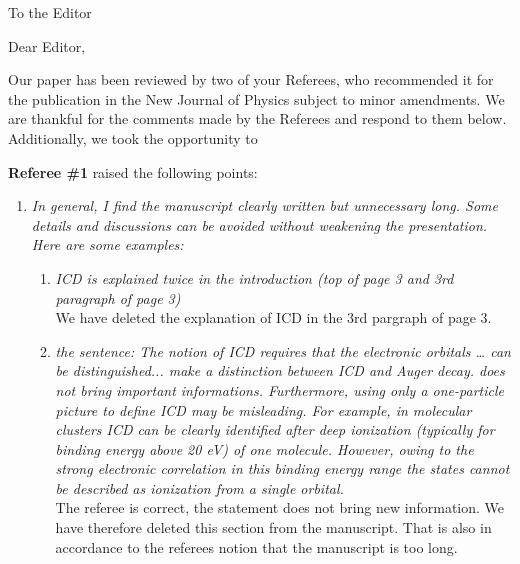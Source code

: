 \documentclass[DIN,pagenumber=false,parskip=half,fromalign=left,fromphone=true,fromemail=true,fromurl=false,fromlogo=false,fromrule=false]{scrlttr2}
\begin{document}
\begin{letter}{To the Editor}
	
	\opening{Dear Editor,}


Our paper has been reviewed by two of your Referees,
who recommended it for the publication in the
New Journal of Physics subject to minor amendments.
We are thankful for the comments made by the Referees and
respond to them below. Additionally, we took the opportunity to
{\color{blue}{correct some typos or whatever.}}

\textbf{Referee \#1} raised the following points:

\begin{enumerate}
 \item \emph{In general, I find the manuscript clearly written but unnecessary long. Some details and discussions can be avoided without weakening the presentation. Here are some examples:}
  \begin{enumerate}
   \item \emph{ICD is explained twice in the introduction (top of page 3 and
         3rd paragraph of page 3)}\\
				
				We have deleted the explanation of ICD in the 3rd pargraph of page 3.
				
   \item \emph{the sentence: The notion of ICD requires that the electronic orbitals … can be distinguished... make a distinction between ICD and Auger decay. does not bring important informations. Furthermore, using only a one-particle picture to define ICD may be misleading. For example, in molecular clusters ICD can be clearly identified after deep ionization (typically for binding energy above 20 eV) of one molecule. However, owing to the strong electronic correlation in this binding energy range the states cannot be described as ionization from a single orbital.}\\
	
				The referee is correct, the statement does not bring new information. We have therefore deleted this section from the manuscript. That is also in accordance to the referees notion that the manuscript is too long. 
	

\end{enumerate}
\end{enumerate}
\end{letter}
\end{document}
